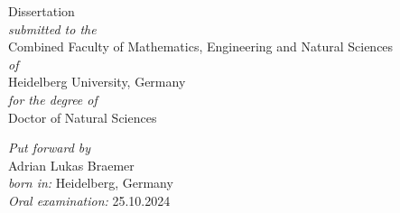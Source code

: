 \thispagestyle{empty}
\begin{addmargin}[-1cm]{-3cm}
\begin{center}
\large




\LARGE
Dissertation\\
\vspace{1cm}
\large
\textit{submitted to the}\\\vspace{0.5cm}
Combined Faculty of Mathematics, Engineering and Natural Sciences\\\vspace{0.5cm}
\textit{of}\\\vspace{0.5cm}
Heidelberg University, Germany\\\vspace{0.5cm}
\textit{for the degree of}\\\vspace{0.5cm}
Doctor of Natural Sciences

\vfill

\textit{Put forward by}\\\vspace{0.5cm}
Adrian Lukas Braemer\\\vspace{0.5cm}
\textit{born in:} Heidelberg, Germany\\\vspace{0.5cm}
\textit{Oral examination:} 25.10.2024



\end{center}
\end{addmargin}